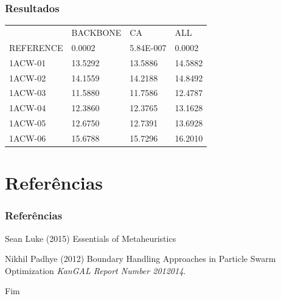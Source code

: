 \documentclass{beamer}
\begin{document}
\begin{frame}
\frametitle{Resultados}
\begin{table}[]
\centering
\label{my-label}
\begin{tabular}{llll}
          & BACKBONE          & CA            & ALL               \\
REFERENCE & 0.0002 & 5.84E-007     & 0.0002 \\
1ACW-01   & 13.5292     & 13.5886 & 14.5882     \\
1ACW-02   & 14.1559     & 14.2188 & 14.8492      \\
1ACW-03   & 11.5880     & 11.7586 & 12.4787     \\
1ACW-04   & 12.3860     & 12.3765 & 13.1628     \\
1ACW-05   & 12.6750     & 12.7391 & 13.6928     \\
1ACW-06   & 15.6788     & 15.7296 & 16.2010                     
\end{tabular}
\end{table}
\end{frame}

\section{Referências}

\begin{frame}
\frametitle{Referências}
\footnotesize{
\begin{thebibliography}{99} %
 Sean Luke (2015)
\newblock Essentials of Metaheuristics

 Nikhil Padhye (2012)
\newblock Boundary Handling Approaches in Particle Swarm Optimization
\newblock \emph{KanGAL Report Number 2012014}.

\end{thebibliography}
}
\end{frame}


\begin{frame}
\Huge{\centerline{Fim}}
\end{frame}

\end{document}
